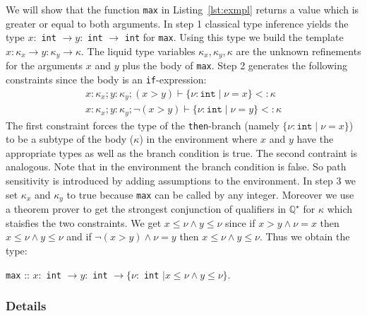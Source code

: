 \documentclass[a4paper,UKenglish]{lipics-v2016}
\begin{document}
We will show that the function \lstinline{max} in Listing~\ref{lst:exmpl} returns a value which is greater or equal to both arguments.
In step 1 classical type inference yields the type $x:$ \lstinline{int} $\rightarrow y:$ \lstinline{int} $\rightarrow$ \lstinline{int} for \lstinline{max}.
Using this type we build the template $x: \kappa_x \rightarrow y: \kappa_y \rightarrow \kappa$.
The liquid type variables $\kappa_x, \kappa_y, \kappa$ are the unknown refinements for the arguments $x$ and $y$ plus the body of \lstinline{max}.
Step 2 generates the following constraints since the body is an \lstinline{if}-expression:
\begin{align}
    \label{algn:max}
    x: \kappa_x; y: \kappa_y; (x > y) \vdash \{\nu: \texttt{int} \mid \nu = x \} <: \kappa\\
    x: \kappa_x; y: \kappa_y; \neg(x > y) \vdash \{\nu: \texttt{int} \mid \nu = y \} <: \kappa
\end{align}
The first constraint forces the type of the \lstinline{then}-branch (namely $\{\nu: \texttt{int} \mid \nu = x \}$) to be a subtype
of the body ($\kappa$) in the environment where $x$ and $y$ have the appropriate types as well as the branch condition is true.
The second contraint is analogous.
Note that in the environment the branch condition is false.
So path sensitivity is introduced by adding assumptions to the environment.
In step 3 we set $\kappa_x$ and $\kappa_y$ to true because \lstinline{max} can be called by any integer.
Moreover we use a theorem prover to get the strongest conjunction of qualifiers in $\mathbb{Q}^\star$ for $\kappa$ which staisfies the two constraints.
We get $x \le \nu \land y \le \nu$ since if $x > y \land \nu = x$ then $x \le \nu \land y \le \nu$ and if $\neg(x > y) \land \nu = y$
then $x \le \nu \land y \le \nu$.
Thus we obtain the type:
\begin{center}
    \lstinline{max} :: $x:$ \lstinline{int} $\rightarrow y:$ \lstinline{int} $\rightarrow \{\nu:$ \lstinline{int} $\mid x \le \nu \land y \le \nu\}$.
\end{center}


\subsubsection{Details}
\end{document}
